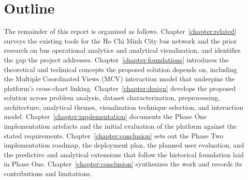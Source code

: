 \section{Outline}
\label{sec:intro:outline}

The remainder of this report is organized as follows.
Chapter~\ref{chapter:related} surveys the existing tools for the Ho
Chi Minh City bus network and the prior research on bus operational
analytics and analytical visualization, and identifies the gap the
project addresses. Chapter~\ref{chapter:foundations} introduces the
theoretical and technical concepts the proposed solution depends on,
including the Multiple Coordinated Views (MCV) interaction model that
underpins the platform's cross-chart linking.
Chapter~\ref{chapter:design} develops the proposed solution across
problem analysis, dataset characterization, preprocessing,
architecture, analytical themes, visualization technique selection,
and interaction model. Chapter~\ref{chapter:implementation} documents
the Phase One implementation artefacts and the initial evaluation of
the platform against the stated requirements.
Chapter~\ref{chapter:conclusion} sets out the Phase Two implementation
roadmap, the deployment plan, the planned user evaluation, and the
predictive and analytical extensions that follow the historical
foundation laid in Phase One. Chapter~\ref{chapter:conclusion}
synthesizes the work and records its contributions and limitations.
